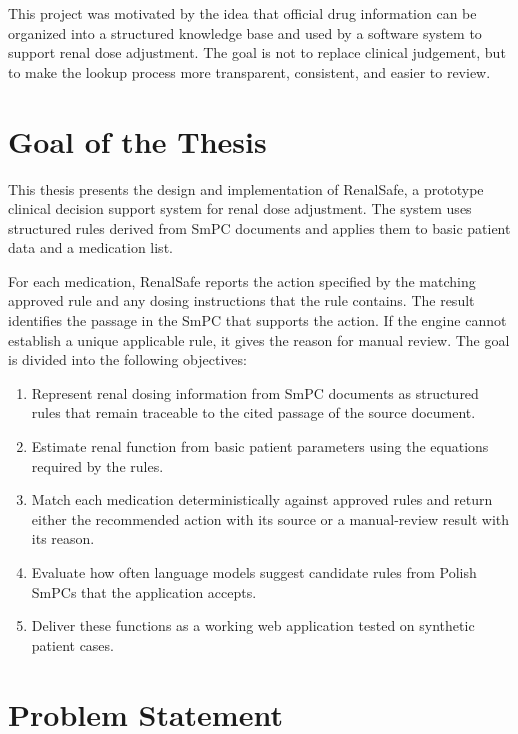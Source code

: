 \documentclass[12pt,a4paper,twoside]{book}
\begin{document}
This project was motivated by the idea that official drug information can be organized into a structured knowledge base and used by a software system to support renal dose adjustment. 
The goal is not to replace clinical judgement, but to make the lookup process more transparent, consistent, and easier to review.

\section{Goal of the Thesis}\label{sec:goal-thesis}

This thesis presents the design and implementation of RenalSafe, a prototype clinical decision support system for renal dose adjustment.
The system uses structured rules derived from SmPC documents and applies them to basic patient data and a medication list.

For each medication, RenalSafe reports the action specified by the matching approved rule and any dosing instructions that the rule contains.
The result identifies the passage in the SmPC that supports the action.
If the engine cannot establish a unique applicable rule, it gives the reason for manual review.
The goal is divided into the following objectives:
\begin{enumerate}[label=O\arabic*.,ref=O\arabic*]
    \item\label{obj:knowledge-base} Represent renal dosing information from SmPC documents as structured rules that remain traceable to the cited passage of the source document.
    \item\label{obj:calculator} Estimate renal function from basic patient parameters using the equations required by the rules.
    \item\label{obj:engine} Match each medication deterministically against approved rules and return either the recommended action with its source or a manual-review result with its reason.
    \item\label{obj:extraction-evaluation} Evaluate how often language models suggest candidate rules from Polish SmPCs that the application accepts.
    \item\label{obj:prototype} Deliver these functions as a working web application tested on synthetic patient cases.
\end{enumerate}


\section{Problem Statement}\label{sec:problem-statement}
\end{document}
